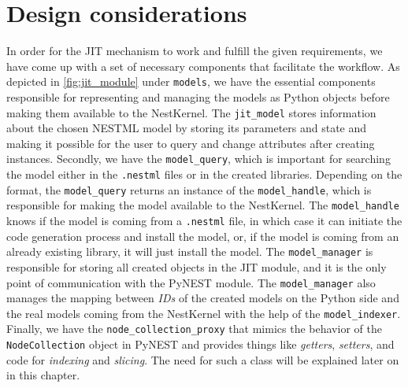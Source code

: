 

\section{Design considerations}

In order for the JIT mechanism to work and fulfill the given requirements, we have come up with a set of necessary components that facilitate the workflow. As depicted in \autoref{fig:jit_module} under \texttt{models}, we have the essential components responsible for representing and managing the models as Python objects before making them available to the NestKernel. The \texttt{jit\_model} stores information about the chosen NESTML model by storing its parameters and state and making it possible for the user to query and change attributes after creating instances. Secondly, we have the \texttt{model\_query}, which is important for searching the model either in the \texttt{.nestml} files or in the created libraries. Depending on the format, the \texttt{model\_query} returns an instance of the \texttt{model\_handle}, which is responsible for making the model available to the NestKernel. The \texttt{model\_handle} knows if the model is coming from a \texttt{.nestml} file, in which case it can initiate the code generation process and install the model, or, if the model is coming from an already existing library, it will just install the model. The \texttt{model\_manager} is responsible for storing all created objects in the JIT module, and it is the only point of communication with the PyNEST module. The \texttt{model\_manager} also manages the mapping between \emph{IDs} of the created models on the Python side and the real models coming from the NestKernel with the help of the \texttt{model\_indexer}. Finally, we have the \texttt{node\_collection\_proxy} that mimics the behavior of the \texttt{NodeCollection} object in PyNEST and provides things like \emph{getters}, \emph{setters}, and code for \emph{indexing} and \emph{slicing}. The need for such a class will be explained later on in this chapter.

